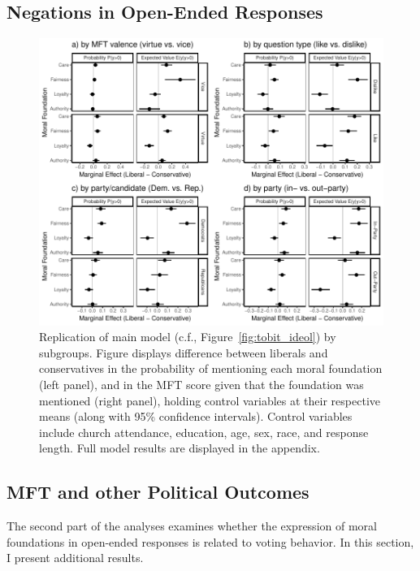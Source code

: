 \documentclass[12pt]{article}
\begin{document}
\subsection{Negations in Open-Ended Responses}

\begin{figure}[ht]\centering
\includegraphics{../calc/fig/tobit_ideol_app.pdf}
\caption{Replication of main model (c.f., Figure~\ref{fig:tobit_ideol}) by subgroups. Figure displays difference between liberals and conservatives in the probability of mentioning each moral foundation (left panel), and in the MFT score given that the foundation was mentioned (right panel), holding control variables at their respective means (along with 95\% confidence intervals). Control variables include church attendance, education, age, sex, race, and response length. Full model results are displayed in the appendix.
}\label{fig:tobit_ideol_app}
\end{figure}


\subsection{MFT and other Political Outcomes}

The second part of the analyses examines whether the expression of moral foundations in open-ended responses is related to voting behavior. In this section, I present additional results.
\end{document}
